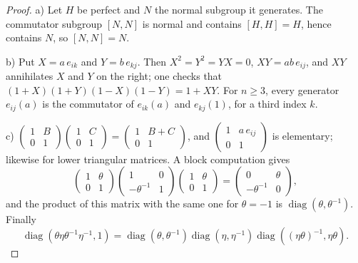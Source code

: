 \begin{proof}
a) Let $H$ be perfect and $N$ the normal subgroup it generates. The commutator subgroup $[N, N]$ is normal and contains $[H, H] = H$, hence contains $N$, so $[N, N] = N$.

b) Put $X = a\,e_{ik}$ and $Y = b\,e_{kj}$. Then $X^2 = Y^2 = YX = 0$, $XY = ab\,e_{ij}$, and $XY$ annihilates $X$ and $Y$ on the right; one checks that $(1 + X)(1 + Y)(1 - X)(1 - Y) = 1 + XY$. For $n \ge 3$, every generator $e_{ij}(a)$ is the commutator of $e_{ik}(a)$ and $e_{kj}(1)$, for a third index $k$.

c) $\left(\begin{smallmatrix} 1 & B \\ 0 & 1 \end{smallmatrix}\right)\left(\begin{smallmatrix} 1 & C \\ 0 & 1 \end{smallmatrix}\right) = \left(\begin{smallmatrix} 1 & B + C \\ 0 & 1 \end{smallmatrix}\right)$, and $\left(\begin{smallmatrix} 1 & a\,e_{ij} \\ 0 & 1 \end{smallmatrix}\right)$ is elementary; likewise for lower triangular matrices. A block computation gives
\[
\begin{pmatrix} 1 & \theta \\ 0 & 1 \end{pmatrix}\begin{pmatrix} 1 & 0 \\ -\theta^{-1} & 1 \end{pmatrix}\begin{pmatrix} 1 & \theta \\ 0 & 1 \end{pmatrix} = \begin{pmatrix} 0 & \theta \\ -\theta^{-1} & 0 \end{pmatrix},
\]
and the product of this matrix with the same one for $\theta = -1$ is $\operatorname{diag}(\theta, \theta^{-1})$. Finally
\[
\operatorname{diag}(\theta\eta\theta^{-1}\eta^{-1}, 1) = \operatorname{diag}(\theta, \theta^{-1})\operatorname{diag}(\eta, \eta^{-1})\operatorname{diag}((\eta\theta)^{-1}, \eta\theta).
\]
\end{proof}

